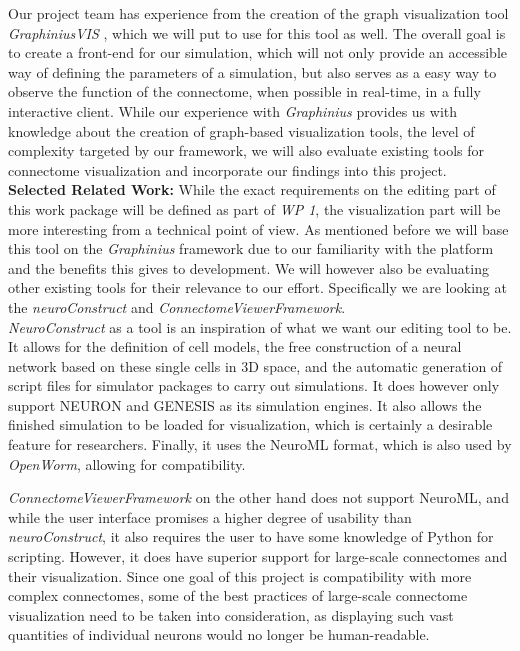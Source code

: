 \documentclass[a4paper,11pt]{article}
\begin{document}
Our project team has experience from the creation of the graph visualization tool \emph{GraphiniusVIS} , which we will put to use for this tool as well. The overall goal is to create a front-end for our simulation, which will not only provide an accessible way of defining the parameters of a simulation, but also serves as a easy way to observe the function of the connectome, when possible in real-time, in a fully interactive client. While our experience with \emph{Graphinius} provides us with knowledge about the creation of graph-based visualization tools, the level of complexity targeted by our framework, we will also evaluate existing tools for connectome visualization and incorporate our findings into this project.
\\[0,2cm]

\textbf{Selected Related Work:}
While the exact requirements on the editing part of this work package will be defined as part of \emph{WP 1}, the visualization part will be more interesting from a technical point of view.
As mentioned before we will base this tool on the \emph{Graphinius} framework  due to our familiarity with the platform and the benefits this gives to development.  We will however also be evaluating other existing tools for their relevance to our effort. Specifically we are looking at the \emph{neuroConstruct} and \emph{ConnectomeViewerFramework}.\\

\emph{NeuroConstruct} \citep{Gleeson2007} as a tool is an inspiration of what we want our editing tool to be. It allows for the definition of cell models, the free construction of a neural network based on these single cells in 3D space, and the automatic generation of script files for simulator packages to carry out simulations. It does however only support NEURON \citep{Hines1994} and GENESIS \citep{Bower2003} as its simulation engines. It also allows the finished simulation to be loaded for visualization, which is certainly a desirable feature for researchers. Finally, it uses the NeuroML format, which is also used by \emph{OpenWorm}, allowing for compatibility. 

\emph{ConnectomeViewerFramework} \citep{Gerhard2011} on the other hand does not support NeuroML, and while the user interface promises a higher degree of usability than \emph{neuroConstruct}, it also requires the user to have some knowledge of Python for scripting. However, it does have superior support for large-scale connectomes and their visualization. Since one goal of this project is compatibility with more complex connectomes, some of the best practices of large-scale connectome visualization need to be taken into consideration, as displaying such vast quantities of individual neurons would no longer be human-readable.
\\[0,2cm]
\end{document}
